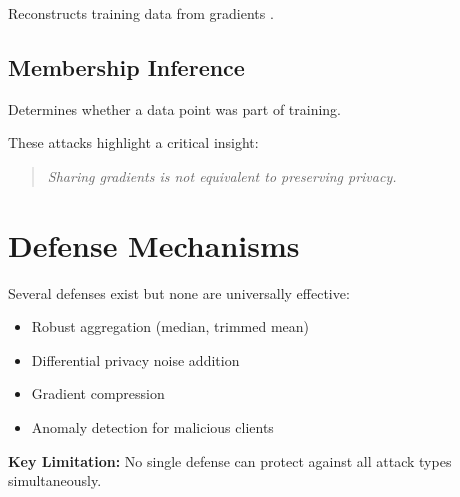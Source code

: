 Reconstructs training data from gradients \cite{zhu2019deep, geiping2020inverting}.

\subsection{Membership Inference}

Determines whether a data point was part of training.

\vspace{0.5cm}
These attacks highlight a critical insight:

\begin{quote}
\textit{Sharing gradients is not equivalent to preserving privacy.}
\end{quote}

\section{Defense Mechanisms}

Several defenses exist but none are universally effective:

\begin{itemize}
    \item Robust aggregation (median, trimmed mean)
    \item Differential privacy noise addition
    \item Gradient compression
    \item Anomaly detection for malicious clients
\end{itemize}

\textbf{Key Limitation:} No single defense can protect against all attack types simultaneously.
